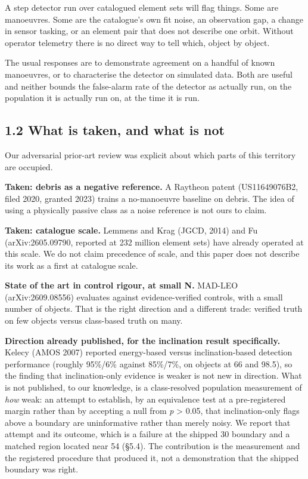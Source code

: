 \documentclass[11pt]{article}
\begin{document}
A step detector run over catalogued element sets will flag things. Some are manoeuvres. Some are the catalogue's own fit noise, an observation gap, a change in sensor tasking, or an element pair that does not describe one orbit. Without operator telemetry there is no direct way to tell which, object by object.

The usual responses are to demonstrate agreement on a handful of known manoeuvres, or to characterise the detector on simulated data. Both are useful and neither bounds the false-alarm rate of the detector as actually run, on the population it is actually run on, at the time it is run.

\subsection*{1.2 What is taken, and what is not}

Our adversarial prior-art review was explicit about which parts of this territory are occupied.

\textbf{Taken: debris as a negative reference.} A Raytheon patent (US11649076B2, filed 2020, granted 2023) trains a no-manoeuvre baseline on debris. The idea of using a physically passive class as a noise reference is not ours to claim.

\textbf{Taken: catalogue scale.} Lemmens and Krag (JGCD, 2014) and Fu (arXiv:2605.09790, reported at 232 million element sets) have already operated at this scale. We do not claim precedence of scale, and this paper does not describe its work as a first at catalogue scale.

\textbf{State of the art in control rigour, at small N.} MAD-LEO (arXiv:2609.08556) evaluates against evidence-verified controls, with a small number of objects. That is the right direction and a different trade: verified truth on few objects versus class-based truth on many.

\textbf{Direction already published, for the inclination result specifically.} Kelecy (AMOS 2007) reported energy-based versus inclination-based detection performance (roughly 95\%/6\% against 85\%/7\%, on objects at 66\textdegree{} and 98.5\textdegree{}), so the finding that inclination-only evidence is weaker is not new in direction. What is not published, to our knowledge, is a class-resolved population measurement of \emph{how} weak: an attempt to establish, by an equivalence test at a pre-registered margin rather than by accepting a null from \emph{p} > 0.05, that inclination-only flags above a boundary are uninformative rather than merely noisy. We report that attempt and its outcome, which is a failure at the shipped 30\textdegree{} boundary and a matched region located near 54\textdegree{} (\S{}5.4). The contribution is the measurement and the registered procedure that produced it, not a demonstration that the shipped boundary was right.
\end{document}
